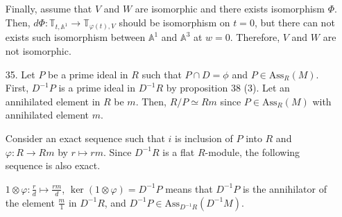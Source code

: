 \documentclass[12pt]{article}
\begin{document}
\begin{enumerate}
Finally, assume that $V$ and $W$ are isomorphic and there exists isomorphism $\Phi$. Then, $d\Phi:\mathbb{T}_{t, \mathbb{A}^1}\rightarrow \mathbb{T}_{\varphi(t),V}$ should be isomorphism on $t=0$, but there can not exists such isomorphism between $\mathbb{A}^1$ and $\mathbb{A}^3$ at $w=0$. Therefore, $V$ and $W$ are not isomorphic.
\newpage
\item[35.] Let $P$ be a prime ideal in $R$ such that $P\cap D=\phi$ and $P\in \text{Ass}_R(M)$. First, $D^{-1}P$ is a prime ideal in $D^{-1}R$ by proposition 38 (3). Let an annihilated element in $R$ be $m$. Then, $R/P \simeq Rm$ since $P\in \text{Ass}_R(M)$ with annihilated element $m$.

Consider an exact sequence such that $i$ is inclusion of $P$ into $R$ and $\varphi:R\rightarrow Rm$ by $r\mapsto rm$. Since $D^{-1}R$ is a flat $R$-module, the following sequence is also exact.
\begin{figure}[!h]
\centering
{}
\end{figure}
\begin{figure}[!h]
\centering
{}
\end{figure}

$1\otimes \varphi: \frac{r}{d}\mapsto \frac{rm}{d}$, $\ker (1\otimes \varphi)=D^{-1}P$ means that $D^{-1}P$ is the annihilator of the element $\frac{m}{1}$ in $D^{-1}R$, and $D^{-1}P\in \text{Ass}_{D^{-1}R}(D^{-1}M)$.
\end{enumerate}
\end{document}

